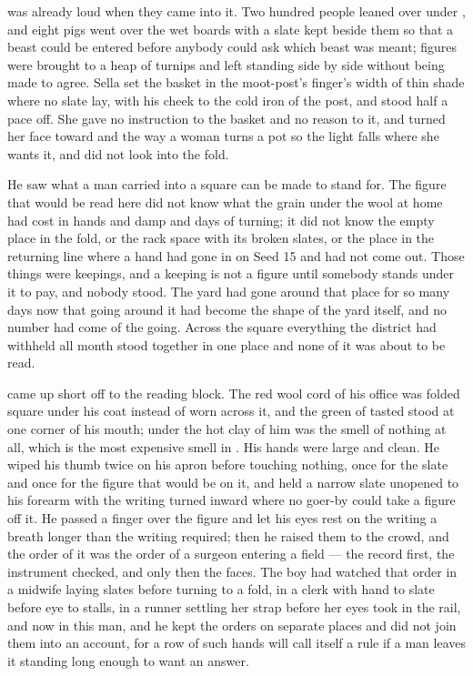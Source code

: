 \scenebreak

 was already loud when they came into it. Two hundred people leaned over  under , and eight pigs went over the wet boards with a slate kept beside them so that a beast could be entered before anybody could ask which beast was meant; figures were brought to a heap of turnips and left standing side by side without being made to agree. Sella set the basket in the moot-post's finger's width of thin shade where no slate lay, with his cheek to the cold iron of the post, and stood half a pace off. She gave no instruction to the basket and no reason to it, and turned her face toward  and  the way a woman turns a pot so the light falls where she wants it, and did not look into the fold.

He saw what a man carried into a square can be made to stand for. The figure that would be read here did not know what the grain under the wool at home had cost in hands and damp and days of turning; it did not know the empty place in the fold, or the rack space with its broken slates, or the place in the returning line where a hand had gone in on Seed 15 and had not come out. Those things were keepings, and a keeping is not a figure until somebody stands under it to pay, and nobody stood. The yard had gone around that place for so many days now that going around it had become the shape of the yard itself, and no number had come of the going. Across the square everything the district had withheld all month stood together in one place and none of it was about to be read.

 came up short off  to the reading block. The red wool cord of his office was folded square under his coat instead of worn across it, and the green of tasted  stood at one corner of his mouth; under the hot clay of him was the smell of nothing at all, which is the most expensive smell in . His hands were large and clean. He wiped his thumb twice on his apron before touching nothing, once for the slate and once for the figure that would be on it, and held a narrow slate unopened to his forearm with the writing turned inward where no goer-by could take a figure off it. He passed a finger over the figure and let his eyes rest on the writing a breath longer than the writing required; then he raised them to the crowd, and the order of it was the order of a surgeon entering a field --- the record first, the instrument checked, and only then the faces. The boy had watched that order in a midwife laying slates before turning to a fold, in a clerk with hand to slate before eye to stalls, in a runner settling her strap before her eyes took in the rail, and now in this man, and he kept the orders on separate places and did not join them into an account, for a row of such hands will call itself a rule if a man leaves it standing long enough to want an answer.

